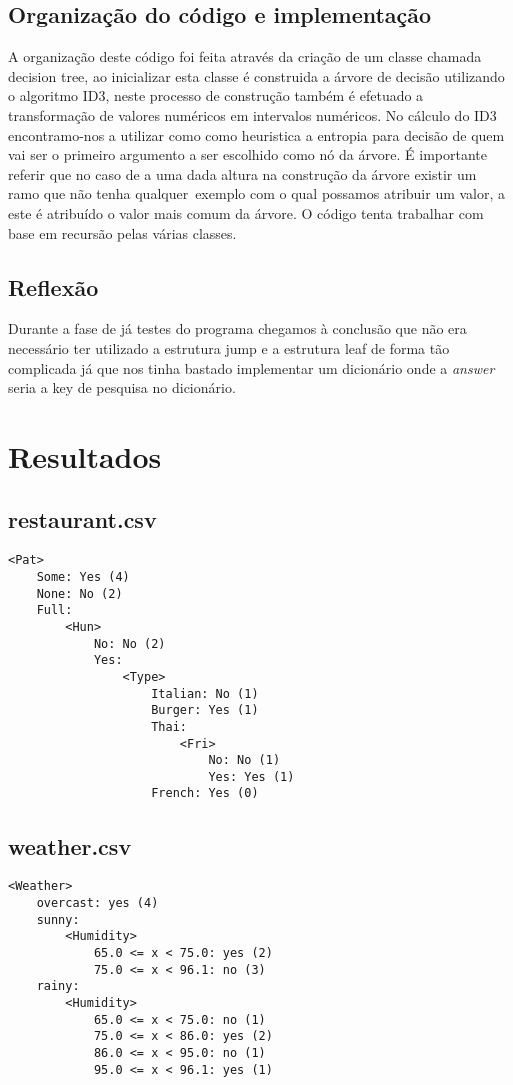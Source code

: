 \documentclass[12pt,a4paper]{article}
\begin{document}
\subsection{Organização do código e implementação}
A organização deste código foi feita através da criação de um classe chamada decision tree, ao inicializar esta classe é construida a árvore de decisão utilizando o algoritmo ID3, neste processo de construção também é efetuado a transformação de valores numéricos em intervalos numéricos. No cálculo do ID3 encontramo-nos a utilizar como como heuristica a entropia para decisão de quem vai ser o primeiro argumento a ser escolhido como nó da árvore. É importante referir que no caso de a uma dada altura na construção da árvore existir um ramo que não tenha qualquer~exemplo com o qual possamos atribuir um valor, a este é atribuído o valor mais comum da árvore.
O código tenta trabalhar com base em recursão pelas várias classes.

\subsection{Reflexão}
Durante a fase de já testes do programa chegamos à conclusão que não era necessário ter utilizado a estrutura jump e a estrutura leaf de forma tão complicada já que nos tinha bastado implementar um dicionário onde a \textit{answer} seria a key de pesquisa no dicionário.

\section{Resultados}
\subsection{restaurant.csv}
\begin{lstlisting}
<Pat>
	Some: Yes (4)
	None: No (2)
	Full:
		<Hun>
			No: No (2)
			Yes:
				<Type>
					Italian: No (1)
					Burger: Yes (1)
					Thai:
						<Fri>
							No: No (1)
							Yes: Yes (1)
					French: Yes (0)
\end{lstlisting}

\subsection{weather.csv}
\begin{lstlisting}
<Weather>
	overcast: yes (4)
	sunny:
		<Humidity>
			65.0 <= x < 75.0: yes (2)
			75.0 <= x < 96.1: no (3)
	rainy:
		<Humidity>
			65.0 <= x < 75.0: no (1)
			75.0 <= x < 86.0: yes (2)
			86.0 <= x < 95.0: no (1)
			95.0 <= x < 96.1: yes (1)
\end{lstlisting}
\end{document}

